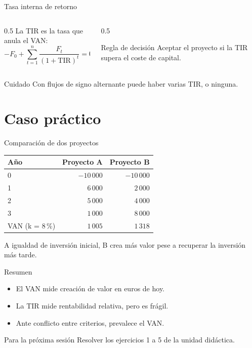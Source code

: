 \documentclass[aspectratio=169]{beamer}
\begin{document}
\begin{frame}{Tasa interna de retorno}
  \begin{columns}[T]
    \begin{column}{0.5\textwidth}
      La TIR es la tasa que anula el VAN:
      \begin{equation*}
        -F_0 + \sum_{t=1}^{n} \frac{F_t}{(1+\mathrm{TIR})^t} = 0
      \end{equation*}
    \end{column}
    \begin{column}{0.5\textwidth}
      \begin{exampleblock}{Regla de decisión}
        Aceptar el proyecto si la TIR supera el coste de capital.
      \end{exampleblock}
    \end{column}
  \end{columns}

  \begin{alertblock}{Cuidado}
    Con flujos de signo alternante puede haber varias TIR, o ninguna.
  \end{alertblock}
\end{frame}

\section{Caso práctico}

\begin{frame}{Comparación de dos proyectos}
  \begin{center}
    \begin{tabular}{lrr}
      \textbf{Año} & \textbf{Proyecto A} & \textbf{Proyecto B} \\
      \hline
      0 & $-10\,000$ & $-10\,000$ \\
      1 & $6\,000$    & $2\,000$    \\
      2 & $5\,000$    & $4\,000$    \\
      3 & $1\,000$    & $8\,000$    \\
      \hline
      VAN (k = 8\,\%) & $1\,005$ & $1\,318$ \\
    \end{tabular}
  \end{center}

  A igualdad de inversión inicial, B crea más valor pese a recuperar la
  inversión más tarde.
\end{frame}

\begin{frame}{Resumen}
  \begin{itemize}
    \item El VAN mide creación de valor en euros de hoy.
    \item La TIR mide rentabilidad relativa, pero es frágil.
    \item Ante conflicto entre criterios, prevalece el VAN.
  \end{itemize}

  \begin{block}{Para la próxima sesión}
    Resolver los ejercicios 1 a 5 de la unidad didáctica.
  \end{block}
\end{frame}
\end{document}
